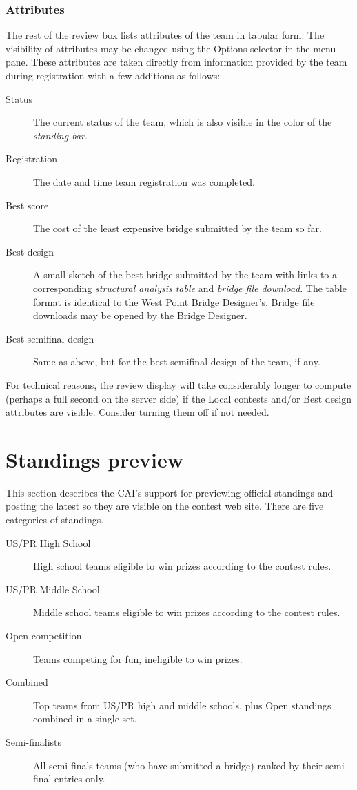 \documentclass[11pt,letterpaper]{refart}
\def\ui#1{\textsf{#1}}
\begin{document}
\subsubsection{Attributes}
\label{sec:review_box_attributes}
The rest of the review box lists attributes of the team in tabular
form. The visibility of attributes may be changed using the
\ui{Options} selector in the menu pane. These attributes are taken
directly from information provided by the team during registration
with a few additions as follows:
\begin{description}
\item[Status] The current status of the team, which is also visible in
  the color of the \emph{standing bar}.
\item[Registration] The date and time team registration was completed.
\item[Best score] The cost of the least expensive bridge submitted by
  the team so far.
\item[Best design] A small sketch of the best bridge submitted by the
  team with links to a corresponding \emph{structural analysis table}
  and \emph{bridge file download}. The table format is identical to
  the West Point Bridge Designer's. Bridge file downloads may be
  opened by the Bridge Designer.
\item[Best semifinal design] Same as above, but for the best
  semifinal design of the team, if any.
\end{description}
For technical reasons, the review display will
take considerably longer to compute (perhaps a full second on the
server side) if the \ui{Local contests} and/or \ui{Best design}
attributes are visible. Consider turning them off if not needed.

\section{Standings preview}
This section describes the CAI's support for previewing official
standings and posting the latest so they are visible on the contest
web site. There are five categories of standings.
\begin{description}
\item[US/PR High School] High school teams eligible to win prizes
  according to the contest rules.
\item[US/PR Middle School] Middle school teams eligible to win prizes
  according to the contest rules.
\item[Open competition] Teams competing for fun, ineligible to win
  prizes.
\item[Combined] Top teams from US/PR high and middle schools, plus
  Open standings combined in a single set.
\item[Semi-finalists] All semi-finals teams (who have submitted a
  bridge) ranked by their semi-final entries only.
\end{description}
\end{document}
